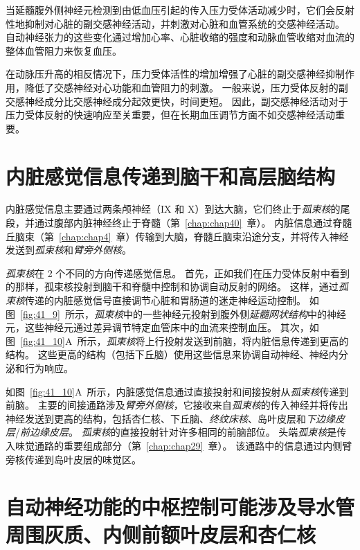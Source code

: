 当延髓腹外侧神经元检测到由低血压引起的传入压力受体活动减少时，它们会反射性地抑制对心脏的副交感神经活动，并刺激对心脏和血管系统的交感神经活动。
自动神经张力的这些变化通过增加心率、心脏收缩的强度和动脉血管收缩对血流的整体血管阻力来恢复血压。


在动脉压升高的相反情况下，压力受体活性的增加增强了心脏的副交感神经抑制作用，降低了交感神经对心功能和血管阻力的刺激。
一般来说，压力受体反射的副交感神经成分比交感神经成分起效更快，时间更短。
因此，副交感神经活动对于压力受体反射的快速响应至关重要，但在长期血压调节方面不如交感神经活动重要。



\section{内脏感觉信息传递到脑干和高层脑结构}

内脏感觉信息主要通过两条颅神经（IX 和 X）到达大脑，它们终止于\textit{孤束核}的尾段，并通过腹部内脏神经终止于脊髓（第~\ref{chap:chap40}~章）。
内脏信息通过脊髓丘脑束（第~\ref{chap:chap4}~章）传输到大脑，脊髓丘脑束沿途分支，并将传入神经发送到\textit{孤束核}和\textit{臂旁外侧核}。


\textit{孤束核}在 2 个不同的方向传递感觉信息。
首先，正如我们在压力受体反射中看到的那样，孤束核投射到脑干和脊髓中控制和协调自动反射的网络。
这样，通过\textit{孤束核}传递的内脏感觉信号直接调节心脏和胃肠道的迷走神经运动控制。
如图~\ref{fig:41_9}~所示，\textit{孤束核}中的一些神经元投射到腹外侧\textit{延髓网状结构}中的神经元，这些神经元通过差异调节特定血管床中的血流来控制血压。
其次，如图~\ref{fig:41_10}A~所示，\textit{孤束核}将上行投射发送到前脑，将内脏信息传递到更高的结构。
这些更高的结构（包括下丘脑）使用这些信息来协调自动神经、神经内分泌和行为响应。


如图~\ref{fig:41_10}A~所示，内脏感觉信息通过直接投射和间接投射从\textit{孤束核}传递到前脑。
主要的间接通路涉及\textit{臂旁外侧核}，它接收来自\textit{孤束核}的传入神经并将传出神经发送到更高的结构，包括杏仁核、下丘脑、\textit{终纹床核}、岛叶皮层和\textit{下边缘皮层}/\textit{前边缘皮层}。
\textit{孤束核}的直接投射针对许多相同的前脑部位。
头端\textit{孤束核}是传入味觉通路的重要组成部分（第~\ref{chap:chap29}~章）。
该通路中的信息通过内侧臂旁核传递到岛叶皮层的味觉区。



\section{自动神经功能的中枢控制可能涉及导水管周围灰质、内侧前额叶皮层和杏仁核}

